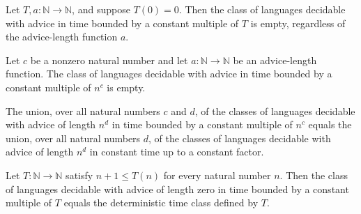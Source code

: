 \begin{theorem}
\label{Complexity.DTIMEAdvice_eq_empty_of_eq_zero}
\leanok
{}
Let $T,a : \mathbb{N} \to \mathbb{N}$, and suppose $T(0)=0$. Then the class of languages
decidable with advice in time bounded by a constant multiple of $T$ is empty, regardless
of the advice-length function $a$.
\end{theorem}

\begin{theorem}
\label{Complexity.DTIMEAdvice_pow_eq_empty}
\leanok
{}
Let $c$ be a nonzero natural number and let $a : \mathbb{N} \to \mathbb{N}$ be an
advice-length function. The class of languages decidable with advice in time bounded by
a constant multiple of $n^c$ is empty.
\end{theorem}

\begin{theorem}
\label{Complexity.iUnion_DTIMEAdvice_pow_eq}
\leanok
{}
The union, over all natural numbers $c$ and $d$, of the classes of languages decidable
with advice of length $n^d$ in time bounded by a constant multiple of $n^c$ equals the
union, over all natural numbers $d$, of the classes of languages decidable with advice
of length $n^d$ in constant time up to a constant factor.
\end{theorem}

\begin{theorem}
\label{Complexity.DTIMEAdvice_zero_eq_DTIME}
\leanok
{}
Let $T : \mathbb{N} \to \mathbb{N}$ satisfy $n+1 \le T(n)$ for every natural number $n$.
Then the class of languages decidable with advice of length zero in time bounded by a
constant multiple of $T$ equals the deterministic time class defined by $T$.
\end{theorem}

